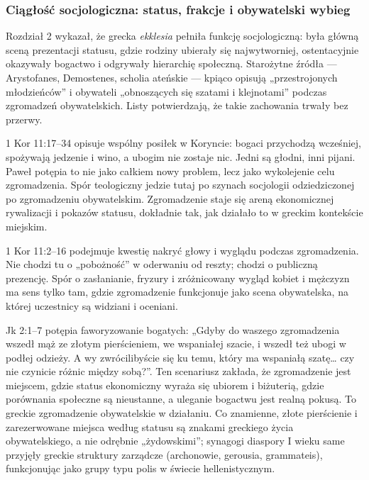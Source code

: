 \subsubsection{Ciągłość socjologiczna: status, frakcje i obywatelski wybieg}\label{subsubsec:sociological-continuity-status-factions-and-the-civic-catwalk}

Rozdział 2 wykazał, że grecka \textit{ekklesia} pełniła funkcję socjologiczną: była główną sceną prezentacji statusu, gdzie rodziny ubierały się najwytworniej, ostentacyjnie okazywały bogactwo i odgrywały hierarchię społeczną.
Starożytne źródła — Arystofanes, Demostenes, scholia ateńskie — kpiąco opisują „przestrojonych młodzieńców” i obywateli „obnoszących się szatami i klejnotami” podczas zgromadzeń obywatelskich.
Listy potwierdzają, że takie zachowania trwały bez przerwy.

1 Kor 11:17–34 opisuje wspólny posiłek w Koryncie: bogaci przychodzą wcześniej, spożywają jedzenie i wino, a ubogim nie zostaje nic.
Jedni są głodni, inni pijani.
Paweł potępia to nie jako całkiem nowy problem, lecz jako wykolejenie celu zgromadzenia.
Spór teologiczny jedzie tutaj po szynach socjologii odziedziczonej po zgromadzeniu obywatelskim.
Zgromadzenie staje się areną ekonomicznej rywalizacji i pokazów statusu, dokładnie tak, jak działało to w greckim kontekście miejskim.

1 Kor 11:2–16 podejmuje kwestię nakryć głowy i wyglądu podczas zgromadzenia.
Nie chodzi tu o „pobożność” w oderwaniu od reszty; chodzi o publiczną prezencję.
Spór o zasłanianie, fryzury i zróżnicowany wygląd kobiet i mężczyzn ma sens tylko tam, gdzie zgromadzenie funkcjonuje jako scena obywatelska, na której uczestnicy są widziani i oceniani.

Jk 2:1–7 potępia faworyzowanie bogatych: „Gdyby do waszego zgromadzenia wszedł mąż ze złotym pierścieniem, we wspaniałej szacie, i wszedł też ubogi w podłej odzieży.
A wy zwrócilibyście się ku temu, który ma wspaniałą szatę… czy nie czynicie różnic między sobą?”.
Ten scenariusz zakłada, że zgromadzenie jest miejscem, gdzie status ekonomiczny wyraża się ubiorem i biżuterią, gdzie porównania społeczne są nieustanne, a uleganie bogactwu jest realną pokusą.
To greckie zgromadzenie obywatelskie w działaniu.
Co znamienne, złote pierścienie i zarezerwowane miejsca według statusu są znakami greckiego życia obywatelskiego, a nie odrębnie „żydowskimi”; synagogi diaspory I wieku same przyjęły greckie struktury zarządcze (archonowie, gerousia, grammateis), funkcjonując jako grupy typu polis w świecie hellenistycznym.

